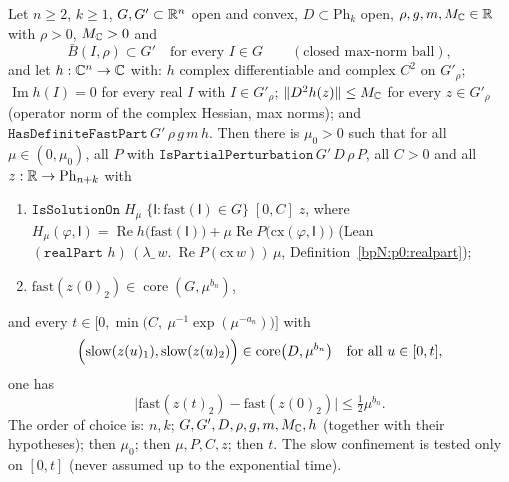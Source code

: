 \begin{theorem}\label{bpN:p0:partial}
Let $n\ge2$, $k\ge1$, $G,G'\subset\mathbb{R}^n$ open and convex, $D\subset\mathrm{Ph}_k$ open, $\rho,g,m,M_{\mathbb{C}}\in\mathbb{R}$ with $\rho>0$, $M_{\mathbb{C}}>0$ and
\[\bar B(I,\rho)\subset G'\quad\text{for every }I\in G\qquad(\text{closed max-norm ball}),\]
and let $h:\mathbb{C}^n\to\mathbb{C}$ with: $h$ complex differentiable and complex $C^2$ on $G'_\rho$; $\operatorname{Im}h(I)=0$ for every real $I$ with $I\in G'_\rho$; $\lVert D^2h(z)\rVert\le M_{\mathbb{C}}$ for every $z\in G'_\rho$ (operator norm of the complex Hessian, max norms); and $\texttt{HasDefiniteFastPart}\,G'\,\rho\,g\,m\,h$. Then there is $\mu_0>0$ such that for all $\mu\in(0,\mu_0)$, all $P$ with $\texttt{IsPartialPerturbation}\,G'\,D\,\rho\,P$, all $C>0$ and all $z:\mathbb{R}\to\mathrm{Ph}_{n+k}$ with
\begin{enumerate}[label=(Z\arabic*)]
\item $\texttt{IsSolutionOn}\;H_\mu\;\{\mathsf I:\mathrm{fast}(\mathsf I)\in G\}\;[0,C]\;z$, where $H_\mu(\varphi,\mathsf I)=\operatorname{Re}h\bigl(\mathrm{fast}(\mathsf I)\bigr)+\mu\operatorname{Re}P\bigl(\mathrm{cx}(\varphi,\mathsf I)\bigr)$ (Lean \,$(\texttt{realPart }h)\,(\lambda\_\,w.\ \operatorname{Re}P(\mathrm{cx}\,w))\,\mu$, Definition~\ref{bpN:p0:realpart});
\item $\mathrm{fast}(z(0)_2)\in\operatorname{core}(G,\mu^{b_n})$,
\end{enumerate}
and every $t\in\bigl[0,\min\bigl(C,\ \mu^{-1}\exp(\mu^{-a_n})\bigr)\bigr]$ with
\[\Bigl(\mathrm{slow}(z(u)_1),\mathrm{slow}(z(u)_2)\Bigr)\in\operatorname{core}\bigl(D,\mu^{b_n}\bigr)\quad\text{for all }u\in[0,t],\]
one has
\[\bigl|\mathrm{fast}(z(t)_2)-\mathrm{fast}(z(0)_2)\bigr|\le\tfrac12\mu^{b_n}.\]
The order of choice is: $n,k$; $G,G',D,\rho,g,m,M_{\mathbb{C}},h$ (together with their hypotheses); then $\mu_0$; then $\mu,P,C,z$; then $t$. The slow confinement is tested only on $[0,t]$ (never assumed up to the exponential time).
\end{theorem}

